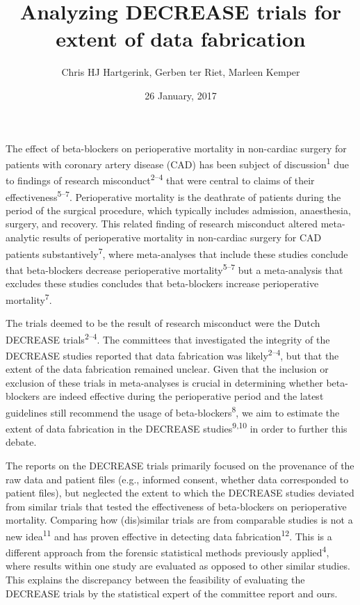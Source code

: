 \documentclass[]{article}
\title{Analyzing DECREASE trials for extent of data fabrication}
\author{Chris HJ Hartgerink, Gerben ter Riet, Marleen Kemper}
\date{26 January, 2017}
\begin{document}
\maketitle

The effect of beta-blockers on perioperative mortality in non-cardiac
surgery for patients with coronary artery disease (CAD) has been subject
of discussion\textsuperscript{1} due to findings of research
misconduct\textsuperscript{2--4} that were central to claims of their
effectiveness\textsuperscript{5--7}. Perioperative mortality is the
deathrate of patients during the period of the surgical procedure, which
typically includes admission, anaesthesia, surgery, and recovery. This
related finding of research misconduct altered meta-analytic results of
perioperative mortality in non-cardiac surgery for CAD patients
substantively\textsuperscript{7}, where meta-analyses that include these
studies conclude that beta-blockers decrease perioperative
mortality\textsuperscript{5--7} but a meta-analysis that excludes these
studies concludes that beta-blockers increase perioperative
mortality\textsuperscript{7}.

The trials deemed to be the result of research misconduct were the Dutch
DECREASE trials\textsuperscript{2--4}. The committees that investigated
the integrity of the DECREASE studies reported that data fabrication was
likely\textsuperscript{2--4}, but that the extent of the data
fabrication remained unclear. Given that the inclusion or exclusion of
these trials in meta-analyses is crucial in determining whether
beta-blockers are indeed effective during the perioperative period and
the latest guidelines still recommend the usage of
beta-blockers\textsuperscript{8}, we aim to estimate the extent of data
fabrication in the DECREASE studies\textsuperscript{9,10} in order to
further this debate.

The reports on the DECREASE trials primarily focused on the provenance
of the raw data and patient files (e.g., informed consent, whether data
corresponded to patient files), but neglected the extent to which the
DECREASE studies deviated from similar trials that tested the
effectiveness of beta-blockers on perioperative mortality. Comparing how
(dis)similar trials are from comparable studies is not a new
idea\textsuperscript{11} and has proven effective in detecting data
fabrication\textsuperscript{12}. This is a different approach from the
forensic statistical methods previously applied\textsuperscript{4},
where results within one study are evaluated as opposed to other similar
studies. This explains the discrepancy between the feasibility of
evaluating the DECREASE trials by the statistical expert of the
committee report and ours.
\end{document}
